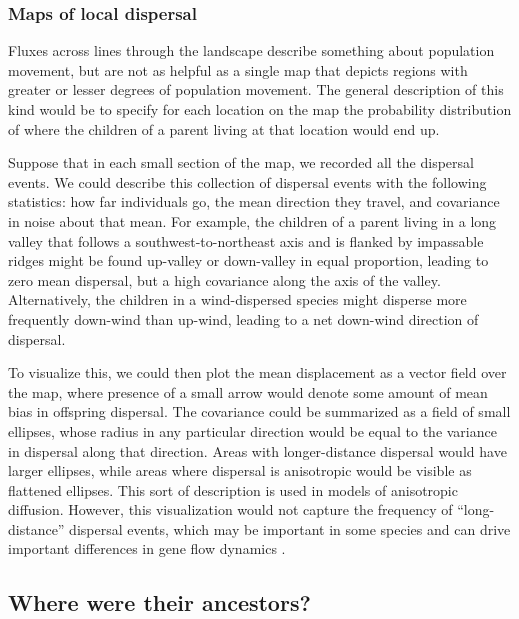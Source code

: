 \documentclass{ar-1col}
\newcommand{\plr}[1]{{\color{green}{#1}}}
\begin{document}
\subsubsection{Maps of local dispersal}


\plr{not sure if we need this section}

Fluxes across lines through the landscape
describe something about population movement,
but are not as helpful 
as a single map that depicts regions with greater or lesser degrees of population movement.
The general description of this kind would be 
to specify for each location on the map
the probability distribution of where 
the children of a parent living at that location would end up.

Suppose that in each small section of the map,
we recorded all the dispersal events.
We could describe this collection of dispersal events 
with the following statistics:
how far individuals go,
the mean direction they travel,
and covariance in noise about that mean.
For example, the children of a parent 
living in a long valley that follows a southwest-to-northeast axis 
and is flanked by impassable ridges might be found up-valley 
or down-valley in equal proportion, 
leading to zero mean dispersal,
but a high covariance along the axis of the valley.
Alternatively, the children in a wind-dispersed species
might disperse more frequently down-wind than up-wind, 
leading to a net down-wind direction of dispersal.

To visualize this,
we could then plot the mean displacement as a vector field over the map,
where presence of a small arrow would denote some amount of mean bias in offspring dispersal.
The covariance could be summarized as a field of small ellipses,
whose radius in any particular direction would be equal to the variance in dispersal
along that direction.
Areas with longer-distance dispersal would have larger ellipses,
while areas where dispersal is anisotropic would be visible as flattened ellipses.
This sort of description is used in models of anisotropic diffusion.
However, this visualization would not capture the frequency of ``long-distance'' dispersal events,
which may be important in some species \citep{levin_et_al_seed_dispersal}
and can drive important differences in gene flow dynamics \citep{HallatschekFisher2014}.

\subsection{Where were their ancestors?}
\end{document}
